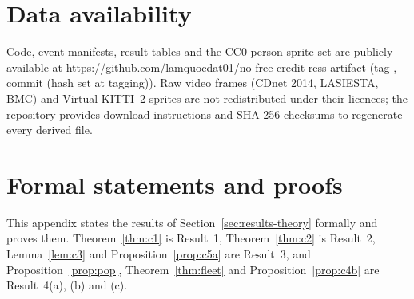 \documentclass[preprint,12pt]{elsarticle}
\providecommand{\nRepoHashShort}{(hash set at tagging)}
\newcommand{\repohash}{\nRepoHashShort}
\theoremstyle{definition}
\theoremstyle{remark}
\begin{document}
\section*{Data availability}
Code, event manifests, result tables and the CC0 person-sprite set are publicly available at
\url{https://github.com/lamquocdat01/no-free-credit-ress-artifact} (tag \nRepoTag, commit \repohash). Raw video frames
(CDnet 2014, LASIESTA, BMC) and Virtual KITTI~2 sprites are not redistributed under their licences; the repository
provides download instructions and SHA-256 checksums to regenerate every derived file.

\appendix
\section{Formal statements and proofs}\label{app:proofs}
\renewcommand{\thetheorem}{A.\arabic{theorem}}
This appendix states the results of Section~\ref{sec:results-theory} formally and proves them. Theorem~\ref{thm:c1} is
Result~1, Theorem~\ref{thm:c2} is Result~2, Lemma~\ref{lem:c3} and Proposition~\ref{prop:c5a} are Result~3, and
Proposition~\ref{prop:pop}, Theorem~\ref{thm:fleet} and Proposition~\ref{prop:c4b} are Result~4(a), (b) and (c).
{\let\section\subsection
\renewcommand{\paragraph}[1]{\par\medskip\noindent\textbf{#1}\ }%

}



\end{document}
